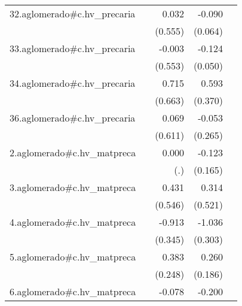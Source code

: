 {\begin{longtable}{l*{4}{D{.}{.}{-1}}}
\addlinespace
32.aglomerado#c.hv\_precaria&                     &       0.032         &      -0.090         &                     \\
            &                     &     (0.555)         &     (0.064)         &                     \\
\addlinespace
33.aglomerado#c.hv\_precaria&                     &      -0.003         &      -0.124\sym{*}  &                     \\
            &                     &     (0.553)         &     (0.050)         &                     \\
\addlinespace
34.aglomerado#c.hv\_precaria&                     &       0.715         &       0.593         &                     \\
            &                     &     (0.663)         &     (0.370)         &                     \\
\addlinespace
36.aglomerado#c.hv\_precaria&                     &       0.069         &      -0.053         &                     \\
            &                     &     (0.611)         &     (0.265)         &                     \\
\addlinespace
2.aglomerado#c.hv\_matpreca&                     &       0.000         &      -0.123         &                     \\
            &                     &         (.)         &     (0.165)         &                     \\
\addlinespace
3.aglomerado#c.hv\_matpreca&                     &       0.431         &       0.314         &                     \\
            &                     &     (0.546)         &     (0.521)         &                     \\
\addlinespace
4.aglomerado#c.hv\_matpreca&                     &      -0.913\sym{**} &      -1.036\sym{***}&                     \\
            &                     &     (0.345)         &     (0.303)         &                     \\
\addlinespace
5.aglomerado#c.hv\_matpreca&                     &       0.383         &       0.260         &                     \\
            &                     &     (0.248)         &     (0.186)         &                     \\
\addlinespace
6.aglomerado#c.hv\_matpreca&                     &      -0.078         &      -0.200         &                     \\

\end{longtable}}
